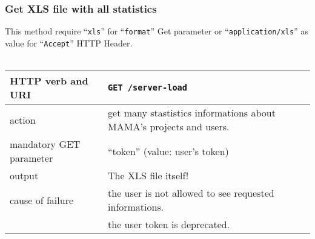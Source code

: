 \subsubsection{Get XLS file with all statistics}
\hspace*{\parindent}
This method require ``\texttt{xls}'' for ``\texttt{format}'' Get parameter or ``\texttt{application/xls}'' as value for ``\texttt{Accept}'' HTTP Header.
\\~\\
\begin{tabular}{ | l | l | }
	\hline
	HTTP verb and URI & \texttt{GET /server-load} \\
	\hline
	action & get many stastistics informations about MAMA's projects and users. \\
	\hline
	mandatory GET parameter & ``token'' (value: user's token) \\
	\hline
	output & The XLS file itself! \\
	\hline
	cause of failure & the user is not allowed to see requested informations. \\
	\space & the user token is deprecated. \\
	\hline
\end{tabular}
\newline

